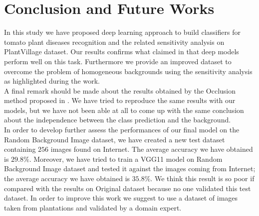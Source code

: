 \section{Conclusion and Future Works}
In this study we have proposed deep learning approach to build classifiers for tomato plant diseases recognition and the related sensitivity analysis on PlantVillage dataset. Our results confirms what claimed in \cite{ref11} that deep models perform well on this task. Furthermore we provide an improved dataset to overcome the problem of homogeneous backgrounds using the sensitivity analysis as highlighted during the work.
\\\indent
A final remark should be made about the results obtained by the Occlusion method proposed in \cite{ref11}. We have tried to reproduce the same results with our models, but we have not been able at all to come up with the same conclusion about the independence between the class prediction and the background.
\\\indent
In order to develop further assess the performances of our final model on the Random Background Image dataset, we have created a new test dataset containing $256$ images found on Internet. The average accuracy we have obtained is $29.8\%$. Moreover, we have tried to train a VGG11 model on Random Background Image dataset and tested it against the images coming from Internet; the average accuracy we have obtained is $35.8\%$.
We think this result is so poor if compared with the results on Original dataset because no one validated this test dataset. In order to improve this work we suggest to use a dataset of images taken from plantations and validated by a domain expert.